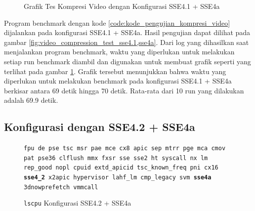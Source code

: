 \begin{figure}
    \centering
    \caption{Grafik Tes Kompresi Video dengan Konfigurasi SSE4.1 + SSE4a}
    \label{fig:video_compression_test_sse4.1,sse4a_graph}
\end{figure}

Program benchmark dengan kode \ref{code:kode_pengujian_kompresi_video} dijalankan pada konfigurasi SSE4.1 + SSE4a. Hasil pengujian dapat dilihat pada gambar \ref{fig:video_compression_test_sse4.1,sse4a}. Dari log yang dihasilkan saat menjalankan program benchmark, waktu yang diperlukan untuk melakukan setiap run benchmark diambil dan digunakan untuk membuat grafik seperti yang terlihat pada gambar \ref{fig:video_compression_test_sse4.1,sse4a_graph}. Grafik tersebut menunjukkan bahwa waktu yang diperlukan untuk melakukan benchmark pada konfigurasi SSE4.1 + SSE4a berkisar antara 69 detik hingga 70 detik. Rata-rata dari 10 run yang dilakukan adalah 69.9 detik.

\subsection{Konfigurasi dengan SSE4.2 + SSE4a}
\begin{figure}
    \texttt{fpu de pse tsc msr pae mce cx8 apic sep mtrr pge mca cmov pat pse36 clflush mmx fxsr sse sse2 ht syscall nx lm rep\_good nopl cpuid extd\_apicid tsc\_known\_freq pni cx16 \textbf{sse4\_2} x2apic hypervisor lahf\_lm cmp\_legacy svm \textbf{sse4a} 3dnowprefetch vmmcall}
    \caption{\texttt{lscpu} Konfigurasi SSE4.2 + SSE4a}
    \label{fig:lscpu_video_compression_test_sse4.2,sse4a}
\end{figure}

